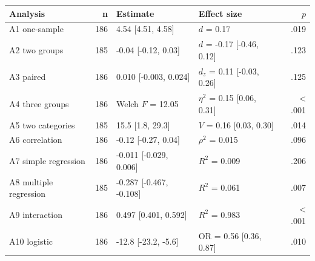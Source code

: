 \begin{tabular}{lrllr}
\toprule
Analysis & n & Estimate & Effect size & $p$ \\
\midrule
A1 one-sample & 186 & 4.54 [4.51, 4.58] & $d$ = 0.17 & .019 \\
A2 two groups & 185 & -0.04 [-0.12, 0.03] & $d$ = -0.17 [-0.46, 0.12] & .123 \\
A3 paired & 186 & 0.010 [-0.003, 0.024] & $d_z$ = 0.11 [-0.03, 0.26] & .125 \\
A4 three groups & 186 & Welch $F$ = 12.05 & $\eta^2$ = 0.15 [0.06, 0.31] & \textless{} .001 \\
A5 two categories & 185 & 15.5 [1.8, 29.3] & $V$ = 0.16 [0.03, 0.30] & .014 \\
A6 correlation & 186 & -0.12 [-0.27, 0.04] & $\rho^2$ = 0.015 & .096 \\
A7 simple regression & 186 & -0.011 [-0.029, 0.006] & $R^2$ = 0.009 & .206 \\
A8 multiple regression & 185 & -0.287 [-0.467, -0.108] & $R^2$ = 0.061 & .007 \\
A9 interaction & 186 & 0.497 [0.401, 0.592] & $R^2$ = 0.983 & \textless{} .001 \\
A10 logistic & 186 & -12.8 [-23.2, -5.6] & OR = 0.56 [0.36, 0.87] & .010 \\
\bottomrule
\end{tabular}
